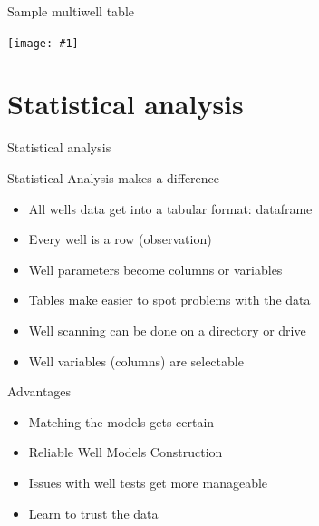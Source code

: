 \documentclass[14pt,ignorenonframetext,]{beamer}
\providecommand{\tightlist}{%
  \setlength{\itemsep}{0pt}\setlength{\parskip}{0pt}}
\def\fullwidth#1{\vspace*{-0.2cm}\par\centerline{\texttt{[image: \#1]}}}
\begin{document}
\begin{frame}{Sample multiwell table}
\protect\hypertarget{sample-multiwell-table}{}

\fullwidth{well_scanner_output_2}

\end{frame}

\hypertarget{statistical-analysis}{%
\section{Statistical analysis}\label{statistical-analysis}}

\begin{frame}{Statistical analysis}
\protect\hypertarget{statistical-analysis-1}{}

\begin{alertblock}{}
Statistical Analysis makes a difference
\end{alertblock}

\vspace{1.0cm}

\fontsize{13}{15}\sf

\begin{itemize}
\tightlist
\item
  All wells data get into a tabular format: dataframe
\item
  Every well is a row (observation)
\item
  Well parameters become columns or variables
\item
  Tables make easier to spot problems with the data
\item
  Well scanning can be done on a directory or drive
\item
  Well variables (columns) are selectable
\end{itemize}

\end{frame}

\begin{frame}{Advantages}
\protect\hypertarget{advantages}{}

\begin{itemize}
\tightlist
\item
  Matching the models gets certain
\item
  Reliable Well Models Construction
\item
  Issues with well tests get more manageable
\item
  Learn to trust the data
\end{itemize}

\end{frame}
\end{document}
